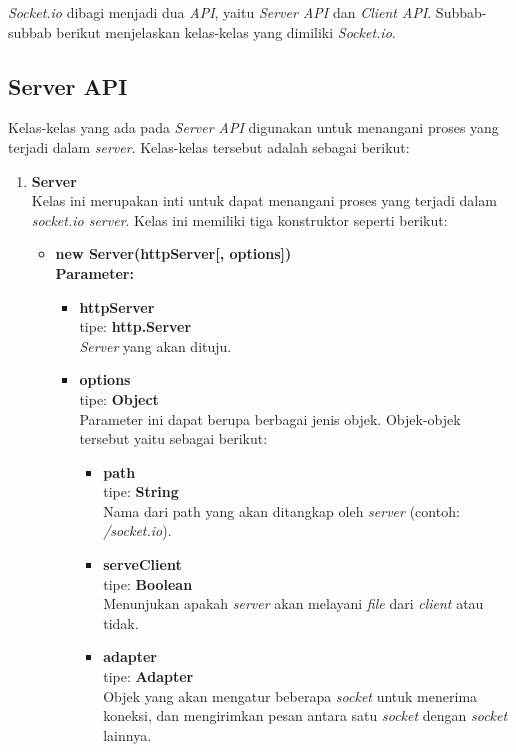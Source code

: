 \textit{Socket.io} dibagi menjadi dua \textit{API}, yaitu \textit{Server API} dan \textit{Client API}. Subbab-subbab berikut menjelaskan kelas-kelas yang dimiliki \textit{Socket.io}.

\subsection{Server API}
Kelas-kelas yang ada pada \textit{Server API} digunakan untuk menangani proses yang terjadi dalam \textit{server}\cite{socketioserver}. Kelas-kelas tersebut adalah sebagai berikut:

\begin{enumerate}
	\item \textbf{Server} \\ Kelas ini merupakan inti untuk dapat menangani proses yang terjadi dalam \textit{socket.io server}. Kelas ini memiliki tiga konstruktor seperti berikut: 
	\begin{itemize}
		\item \textbf{new Server(httpServer[, options])} \\ 
		\textbf{Parameter:}
		\begin{itemize}
			\item \textbf{httpServer} \\ tipe: \textbf{http.Server} \\ \textit{Server} yang akan dituju.
			\item \textbf{options} \\ tipe: \textbf{Object} \\ Parameter ini dapat berupa berbagai jenis objek. Objek-objek tersebut yaitu sebagai berikut: 
			\begin{itemize}
				\item \textbf{path} \\ tipe: \textbf{String} \\ Nama dari path yang akan ditangkap oleh \textit{server} (contoh: \textit{/socket.io}).
				
				\item \textbf{serveClient} \\ tipe: \textbf{Boolean} \\ Menunjukan apakah \textit{server} akan melayani \textit{file} dari \textit{client} atau tidak.
				
				\item \textbf{adapter} \\ tipe: \textbf{Adapter} \\ Objek yang akan mengatur beberapa \textit{socket} untuk menerima koneksi, dan mengirimkan pesan antara satu \textit{socket} dengan \textit{socket} lainnya.
				

\end{itemize}
\end{itemize}
\end{itemize}
\end{enumerate}
